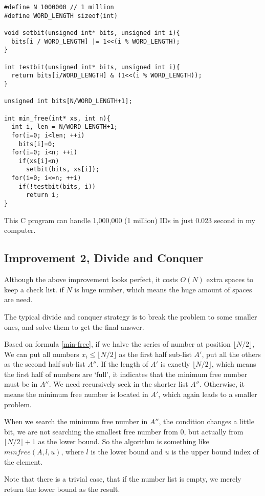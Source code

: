 \documentclass{article}
\begin{document}
\lstset{language = C}
\begin{lstlisting}
#define N 1000000 // 1 million
#define WORD_LENGTH sizeof(int)

void setbit(unsigned int* bits, unsigned int i){
  bits[i / WORD_LENGTH] |= 1<<(i % WORD_LENGTH);
}

int testbit(unsigned int* bits, unsigned int i){
  return bits[i/WORD_LENGTH] & (1<<(i % WORD_LENGTH));
}

unsigned int bits[N/WORD_LENGTH+1];

int min_free(int* xs, int n){
  int i, len = N/WORD_LENGTH+1;
  for(i=0; i<len; ++i)
    bits[i]=0;
  for(i=0; i<n; ++i)
    if(xs[i]<n)
      setbit(bits, xs[i]);
  for(i=0; i<=n; ++i)
    if(!testbit(bits, i))
      return i;
}
\end{lstlisting}

This C program can handle 1,000,000 (1 million) IDs in just 0.023 second
in my computer.

\subsection{Improvement 2, Divide and Conquer}
Although the above improvement looks perfect, it costs $O(N)$ extra
spaces to keep a check list. if $N$ is huge number, which means
the huge amount of spaces are need. 

The typical divide and conquer strategy is to break the problem
to some smaller ones, and solve them to get the final answer.

Based on formula \ref{min-free}, if we halve the series of number
at position $\lfloor N/2 \rfloor$, We can put all numbers $x_i \leq \lfloor N/2 \rfloor$ as the first half sub-list $A'$, put all the others as 
the second half sub-list $A''$.
If the length of $A'$ is exactly $\lfloor N/2 \rfloor$, which means
the first half of numbers are `full', it indicates that the
minimum free number must be in $A''$. We need recursively seek
in the shorter list $A''$. Otherwise, it means the minimum free
number is located in $A'$, which again leads to a smaller problem.

When we search the minimum free number in $A''$, the condition changes
a little bit, we are not searching the smallest free number from
$0$, but actually from $\lfloor N/2 \rfloor + 1$ as the lower bound.
So the algorithm is something like $minfree(A, l, u)$, where $l$ is
the lower bound and $u$ is the upper bound index of the element.

Note that there is a trivial case, that if the number list is
empty, we merely return the lower bound as the result.
\end{document}

